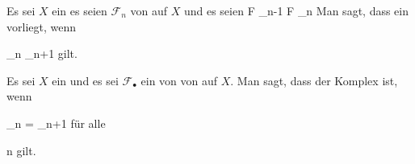 \setcounter{section}{6}








{}
{





Es sei $X$ ein
es seien ${ \mathcal  F   }_n$
von
auf $X$ und es seien
 { { \mathcal  F   }_{n-1} } { { \mathcal  F   }_n
} {}
Man sagt, dass ein
vorliegt, wenn

\mavergleichskettedisp
{\vergleichskette
{  \varphi_{n}
}
{ \subseteq} {  \varphi_{n+1}
}
{ } {
}
{ } {
}
{ } {
}
}
{}{}{}
gilt.





}


{}
{





Es sei $X$ ein
und es sei ${ \mathcal  F   }_\bullet$ ein
von
von
auf $X$. Man sagt, dass der Komplex
ist, wenn

\mavergleichskettedisp
{\vergleichskette
{  \varphi_{n}
}
{ =} {  \varphi_{n+1}
}
{ } {
}
{ } {
}
{ } {
}
}
{}{}{}
für alle

\mavergleichskette
{\vergleichskette
{n
}
{ \in }{\Z
}
{  }{
}
{    }{
}
{   }{
}
}
{}{}{}
gilt.





}






